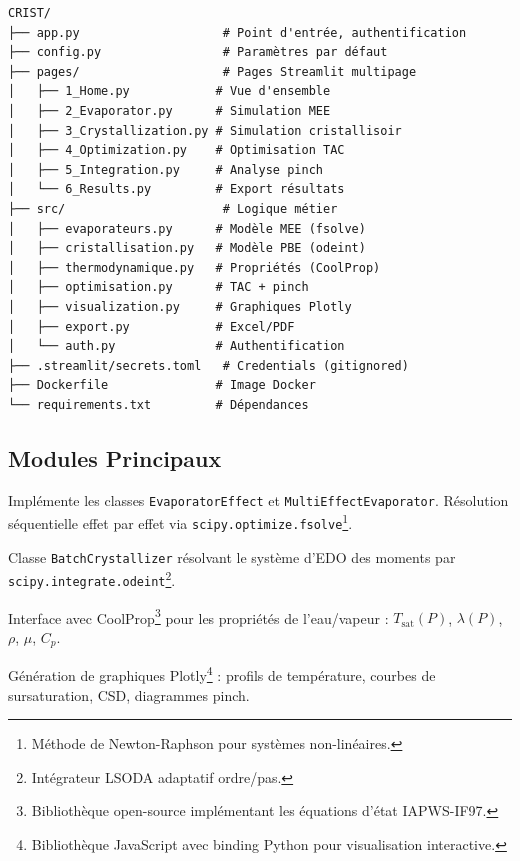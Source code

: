 \documentclass[12pt,a4paper,twoside]{article}
\begin{document}
\begin{verbatim}
CRIST/
├── app.py                    # Point d'entrée, authentification
├── config.py                 # Paramètres par défaut
├── pages/                    # Pages Streamlit multipage
│   ├── 1_Home.py            # Vue d'ensemble
│   ├── 2_Evaporator.py      # Simulation MEE
│   ├── 3_Crystallization.py # Simulation cristallisoir
│   ├── 4_Optimization.py    # Optimisation TAC
│   ├── 5_Integration.py     # Analyse pinch
│   └── 6_Results.py         # Export résultats
├── src/                      # Logique métier
│   ├── evaporateurs.py      # Modèle MEE (fsolve)
│   ├── cristallisation.py   # Modèle PBE (odeint)
│   ├── thermodynamique.py   # Propriétés (CoolProp)
│   ├── optimisation.py      # TAC + pinch
│   ├── visualization.py     # Graphiques Plotly
│   ├── export.py            # Excel/PDF
│   └── auth.py              # Authentification
├── .streamlit/secrets.toml   # Credentials (gitignored)
├── Dockerfile               # Image Docker
└── requirements.txt         # Dépendances
\end{verbatim}

\subsection{Modules Principaux}

\begin{description}[style=nextline]
    \item[\texttt{evaporateurs.py}] Implémente les classes \texttt{EvaporatorEffect} et \texttt{MultiEffectEvaporator}. Résolution séquentielle effet par effet via \texttt{scipy.optimize.fsolve}\footnote{Méthode de Newton-Raphson pour systèmes non-linéaires.}.
    
    \item[\texttt{cristallisation.py}] Classe \texttt{BatchCrystallizer} résolvant le système d'EDO des moments par \texttt{scipy.integrate.odeint}\footnote{Intégrateur LSODA adaptatif ordre/pas.}.
    
    \item[\texttt{thermodynamique.py}] Interface avec CoolProp\footnote{Bibliothèque open-source implémentant les équations d'état IAPWS-IF97.} pour les propriétés de l'eau/vapeur : $T_{\text{sat}}(P)$, $\lambda(P)$, $\rho$, $\mu$, $C_p$.
    
    \item[\texttt{visualization.py}] Génération de graphiques Plotly\footnote{Bibliothèque JavaScript avec binding Python pour visualisation interactive.} : profils de température, courbes de sursaturation, CSD, diagrammes pinch.
\end{description}
\end{document}
